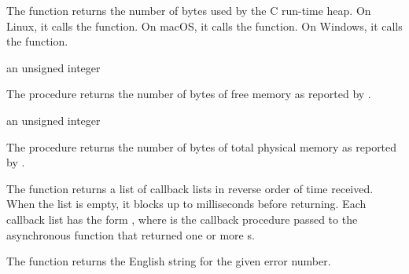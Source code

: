 \begin{function}
\end{function}

The  function returns the number of bytes
used by the C run-time heap. On Linux, it calls the 
function. On macOS, it calls the  function. On Windows,
it calls the  function.

\begin{procedure}
\end{procedure}
\returns{} an unsigned integer

The  procedure returns the number of bytes of free
memory as reported by .

\begin{procedure}
\end{procedure}
\returns{} an unsigned integer

The  procedure returns the number of bytes of
total physical memory as reported by .

\begin{function}
\end{function}

The  function returns a list of callback
lists in reverse order of time received. When the list is empty, it
blocks up to  milliseconds before returning. Each
callback list has the form ,
where  is the callback procedure passed to the
asynchronous function that returned one or more s.

\begin{function}
\end{function}

The  function returns the English string
for the given error number.

\begin{function}
\end{function}

